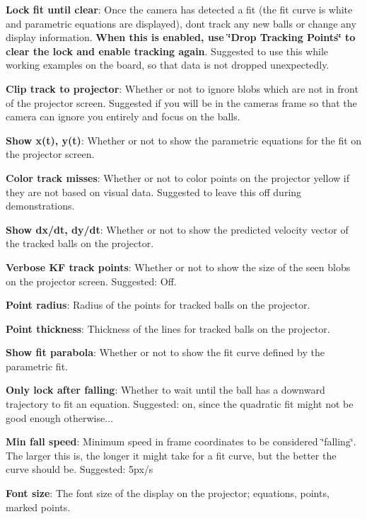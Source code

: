 \begin{DoxyItemize}
\item {\bfseries Lock fit until clear}\+: Once the camera has detected a fit (the fit curve is white and parametric equations are displayed), don\textquotesingle{}t track any new balls or change any display information. {\bfseries When this is enabled, use \char`\"{}\+Drop Tracking
  Points\char`\"{} to clear the lock and enable tracking again}. Suggested to use this while working examples on the board, so that data is not dropped unexpectedly.
\item {\bfseries Clip track to projector}\+: Whether or not to ignore blobs which are not in front of the projector screen. Suggested if you will be in the camera\textquotesingle{}s frame so that the camera can ignore you entirely and focus on the balls.
\item {\bfseries Show x(t), y(t)}\+: Whether or not to show the parametric equations for the fit on the projector screen.
\item {\bfseries Color track misses}\+: Whether or not to color points on the projector yellow if they are not based on visual data. Suggested to leave this off during demonstrations.
\item {\bfseries Show dx/dt, dy/dt}\+: Whether or not to show the predicted velocity vector of the tracked balls on the projector.
\item {\bfseries Verbose KF track points}\+: Whether or not to show the size of the seen blobs on the projector screen. Suggested\+: Off.
\item {\bfseries Point radius}\+: Radius of the points for tracked balls on the projector.
\item {\bfseries Point thickness}\+: Thickness of the lines for tracked balls on the projector.
\item {\bfseries Show fit parabola}\+: Whether or not to show the fit curve defined by the parametric fit.
\item {\bfseries Only lock after falling}\+: Whether to wait until the ball has a downward trajectory to fit an equation. Suggested\+: on, since the quadratic fit might not be good enough otherwise...
\item {\bfseries Min fall speed}\+: Minimum speed in frame coordinates to be considered \char`\"{}falling\char`\"{}. The larger this is, the longer it might take for a fit curve, but the better the curve should be. Suggested\+: 5px/s
\item {\bfseries Font size}\+: The font size of the display on the projector; equations, points, marked points. 
\end{DoxyItemize}